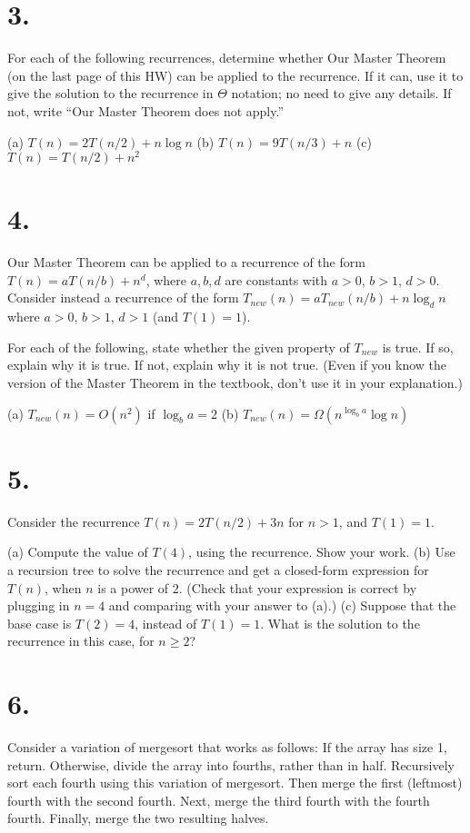 \documentclass{article}
\begin{document}
\section*{3.}
For each of the following recurrences, determine whether Our Master Theorem (on the last page of this HW) can be applied to the recurrence. If it can, use it to give the solution to the recurrence in $\Theta$ notation; no need to give any details. If not, write “Our Master Theorem does not apply.”

(a) $T(n) = 2T(n/2) + n \log n$
(b) $T(n) = 9T(n/3) + n$
(c) $T(n) = T(n/2) + n^2$

\section*{4.}
Our Master Theorem can be applied to a recurrence of the form $T(n) = aT(n/b) + n^d$, where $a, b, d$ are constants with $a > 0$, $b > 1$, $d > 0$. Consider instead a recurrence of the form $T_{new}(n) = aT_{new}(n/b) + n \log_d n$ where $a > 0$, $b > 1$, $d > 1$ (and $T(1) = 1$).

For each of the following, state whether the given property of $T_{new}$ is true. If so, explain why it is true. If not, explain why it is not true. (Even if you know the version of the Master Theorem in the textbook, don’t use it in your explanation.)

(a) $T_{new}(n) = O(n^2)$ if $\log_b a = 2$
(b) $T_{new}(n) = \Omega(n^{\log_b a} \log n)$

\section*{5.}
Consider the recurrence $T(n) = 2T(n/2) + 3n$ for $n > 1$, and $T(1) = 1$.

(a) Compute the value of $T(4)$, using the recurrence. Show your work.
(b) Use a recursion tree to solve the recurrence and get a closed-form expression for $T(n)$, when $n$ is a power of 2. (Check that your expression is correct by plugging in $n = 4$ and comparing with your answer to (a).)
(c) Suppose that the base case is $T(2) = 4$, instead of $T(1) = 1$. What is the solution to the recurrence in this case, for $n \ge 2$?

\section*{6.}
Consider a variation of mergesort that works as follows: If the array has size 1, return. Otherwise, divide the array into fourths, rather than in half. Recursively sort each fourth using this variation of mergesort. Then merge the first (leftmost) fourth with the second fourth. Next, merge the third fourth with the fourth fourth. Finally, merge the two resulting halves.
\end{document}
